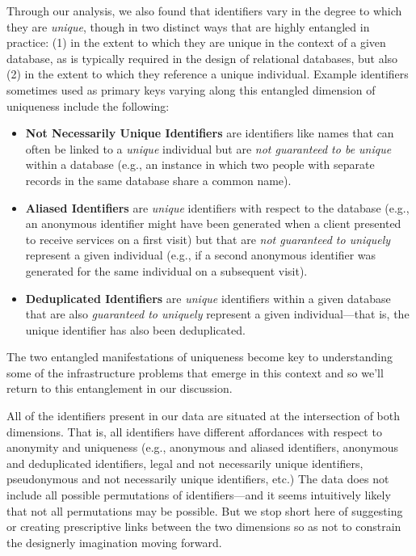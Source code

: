 Through our analysis, we also found that identifiers vary in the degree to which they are \textit{unique}, though in two distinct ways that are highly entangled in practice: (1) in the extent to which they are unique in the context of a given database, as is typically required in the design of relational databases, but also (2) in the extent to which they reference a unique individual. Example identifiers sometimes used as primary keys varying along this entangled dimension of uniqueness include the following:

\begin{itemize}
\item \textbf{Not Necessarily Unique Identifiers} are identifiers like names that can often be linked to a \textit{unique} individual but are \textit{not guaranteed to be unique} within a database (e.g., an instance in which two people with separate records in the same database share a common name).
\item \textbf{Aliased Identifiers} are \textit{unique} identifiers with respect to the database (e.g., an anonymous identifier might have been generated when a client presented to receive services on a first visit) but that are \textit{not guaranteed to uniquely} represent a given individual (e.g., if a second anonymous identifier was generated for the same individual on a subsequent visit).  
\item \textbf{Deduplicated Identifiers} are \textit{unique} identifiers within a given database that are also \textit{guaranteed to uniquely} represent a given individual---that is, the unique identifier has also been deduplicated.
\end{itemize}
The two entangled manifestations of uniqueness become key to understanding some of the infrastructure problems that emerge in this context and so we'll return to this entanglement in our discussion.

All of the identifiers present in our data are situated at the intersection of both dimensions. That is, all identifiers have different affordances with respect to anonymity and uniqueness (e.g., anonymous and aliased identifiers, anonymous and deduplicated identifiers, legal and not necessarily unique identifiers, pseudonymous and not necessarily unique identifiers, etc.) The data does not include all possible permutations of identifiers---and it seems intuitively likely that not all permutations may be possible. But we stop short here of suggesting or creating prescriptive links between the two dimensions so as not to constrain the designerly imagination moving forward.

